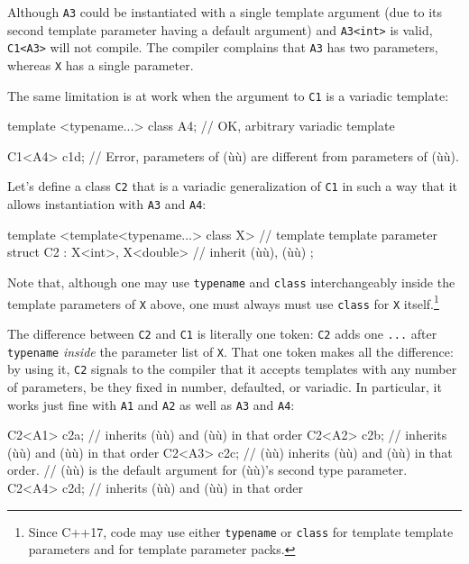 \noindent Although \lstinline!A3! could be instantiated with a single template
argument (due to its second template parameter having a default
argument) and \lstinline!A3<int>! is valid, \lstinline!C1<A3>! will not
compile. The compiler complains that \lstinline!A3! has two parameters,
whereas \lstinline!X! has a single parameter.

The same limitation is at work when the argument to \lstinline!C1! is a
variadic template:

\begin{emcppslisting}
template <typename...>
class A4;    // OK, arbitrary variadic template

C1<A4> c1d;  // Error, parameters of (ù{}ù) are different from parameters of (ù{}ù).
\end{emcppslisting}
    

\noindent Let's define a class \lstinline!C2! that is a variadic generalization of
\lstinline!C1! in such a way that it allows instantiation with \lstinline!A3!
and \lstinline!A4!:

\begin{emcppslisting}
template <template<typename...> class X>  // template template parameter
struct C2 : X<int>, X<double>             // inherit (ù{}ù), (ù{}ù)
{ };
\end{emcppslisting}
    

\noindent Note that, although one may use \lstinline!typename! and \lstinline!class!
interchangeably inside the template parameters of \lstinline!X! above, one
must always must use \lstinline!class! for \lstinline!X!
itself.{\cprotect\footnote{Since C++17, code may use either
\lstinline!typename! or \lstinline!class! for template template parameters
  and for template parameter packs.}}

The difference between \lstinline!C2! and \lstinline!C1! is literally one
token: \lstinline!C2! adds one \lstinline!...! after \lstinline!typename!
\emph{inside} the parameter list of \lstinline!X!. That one token makes all
the difference: by using it, \lstinline!C2! signals to the compiler that it
accepts templates with any number of parameters, be they fixed in
number, defaulted, or variadic. In particular, it works just fine with
\lstinline!A1! and \lstinline!A2! as well as \lstinline!A3! and \lstinline!A4!:

\begin{emcppslisting}
C2<A1> c2a;
    // inherits (ù{}ù) and (ù{}ù) in that order
C2<A2> c2b;
    // inherits (ù{}ù) and (ù{}ù) in that order
C2<A3> c2c;
    // (ù{}ù) inherits (ù{}ù) and (ù{}ù) in that order.
    // (ù{}ù) is the default argument for (ù{}ù)'s second type parameter.
C2<A4> c2d;
    // inherits (ù{}ù) and (ù{}ù) in that order
\end{emcppslisting}
    

